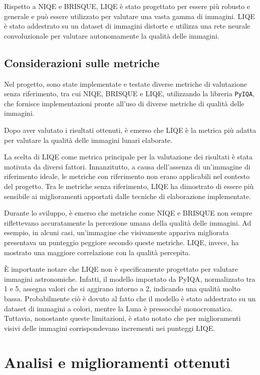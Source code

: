 Rispetto a NIQE e BRISQUE, LIQE è stato progettato per essere più robusto e generale e può essere utilizzato per valutare una vasta gamma di immagini. LIQE è stato addestrato su un dataset di immagini distorte e utilizza una rete neurale convoluzionale per valutare autonomamente la qualità delle immagini.

\subsection{Considerazioni sulle metriche} \label{subsec:why_liqe}

Nel progetto, sono state implementate e testate diverse metriche di valutazione senza riferimento, tra cui NIQE, BRISQUE e LIQE, utilizzando la libreria \texttt{PyIQA}, che fornisce implementazioni pronte all'uso di diverse metriche di qualità delle immagini.

Dopo aver valutato i risultati ottenuti, è emerso che LIQE è la metrica più adatta per valutare la qualità delle immagini lunari elaborate.

La scelta di LIQE come metrica principale per la valutazione dei risultati è stata motivata da diversi fattori. Innanzitutto, a causa dell'assenza di un'immagine di riferimento ideale, le metriche con riferimento non erano applicabili nel contesto del progetto. Tra le metriche senza riferimento, LIQE ha dimostrato di essere più sensibile ai miglioramenti apportati dalle tecniche di elaborazione implementate.

Durante lo sviluppo, è emerso che metriche come NIQE e BRISQUE non sempre riflettevano accuratamente la percezione umana della qualità delle immagini. Ad esempio, in alcuni casi, un'immagine che visivamente appariva migliorata presentava un punteggio peggiore secondo queste metriche. LIQE, invece, ha mostrato una maggiore correlazione con la qualità percepita.

È importante notare che LIQE non è specificamente progettato per valutare immagini astronomiche. Infatti, il modello importato da PyIQA, normalizzato tra 1 e 5, assegna valori che si aggirano intorno a 2, indicando una qualità molto bassa. Probabilmente ciò è dovuto al fatto che il modello è stato addestrato su un dataset di immagini a colori, mentre la Luna è pressocché monocromatica. Tuttavia, nonostante queste limitazioni, è stato notato che per miglioramenti visivi delle immagini corrispondevano incrementi nei punteggi LIQE.

\section{Analisi e miglioramenti ottenuti} \label{sec:analysis}

